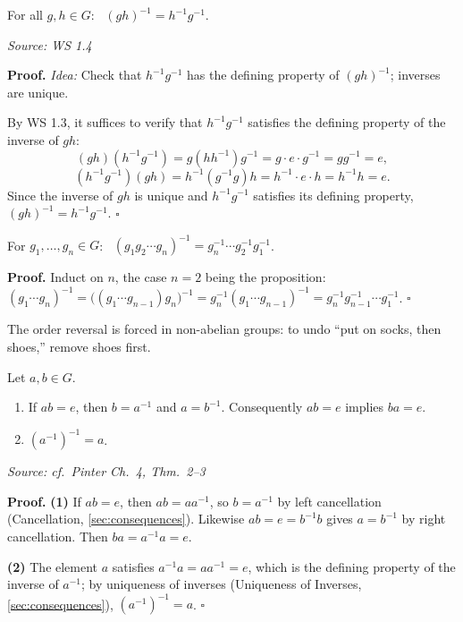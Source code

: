 \documentclass[11pt]{report}
\renewenvironment{proof}[1][Proof]{\noindent\textbf{#1.} }{\hfill$\square$\par\vspace{5pt}}
\newcommand{\srcline}[1]{\par\hfill{\footnotesize\textit{Source: #1}}}
\begin{document}
\begin{propbox}\label{prop:inverse-product}
For all $g, h \in G$: \ $(gh)^{-1} = h^{-1} g^{-1}$.
\srcline{WS 1.4}
\end{propbox}

\begin{proof}
\textit{Idea:} Check that $h^{-1}g^{-1}$ has the defining property of $(gh)^{-1}$; inverses are unique.\par
By WS 1.3, it suffices to verify that $h^{-1} g^{-1}$ satisfies the defining property of the inverse of $gh$:
\[ (gh)(h^{-1} g^{-1}) = g (h h^{-1}) g^{-1} = g \cdot e \cdot g^{-1} = g g^{-1} = e, \]
\[ (h^{-1} g^{-1})(gh) = h^{-1} (g^{-1} g) h = h^{-1} \cdot e \cdot h = h^{-1} h = e. \]
Since the inverse of $gh$ is unique and $h^{-1}g^{-1}$ satisfies its defining property, $(gh)^{-1} = h^{-1} g^{-1}$.
\end{proof}

\begin{corbox}\label{cor:inverse-product-n-elements}
For $g_1, \ldots, g_n \in G$: \ $(g_1 g_2 \cdots g_n)^{-1} = g_n^{-1} \cdots g_2^{-1} g_1^{-1}$.
\end{corbox}

\begin{proof}
Induct on $n$, the case $n = 2$ being the proposition: $(g_1 \cdots g_n)^{-1} = \big((g_1 \cdots g_{n-1})g_n\big)^{-1} = g_n^{-1}(g_1 \cdots g_{n-1})^{-1} = g_n^{-1}g_{n-1}^{-1} \cdots g_1^{-1}$.
\end{proof}

\begin{rembox}\label{rem:socks-shoes}
The order reversal is forced in non-abelian groups: to undo ``put on socks, then shoes,'' remove shoes first.
\end{rembox}

\begin{propbox}\label{prop:one-sided-inverses-suffice}
Let $a, b \in G$.
\begin{enumerate}
    \item If $ab = e$, then $b = a^{-1}$ and $a = b^{-1}$. Consequently $ab = e$ implies $ba = e$.
    \item $(a^{-1})^{-1} = a$.
\end{enumerate}
\srcline{cf.\ Pinter Ch.\ 4, Thm.\ 2--3}
\end{propbox}

\begin{proof}
\textbf{(1)} If $ab = e$, then $ab = a a^{-1}$, so $b = a^{-1}$ by left cancellation (Cancellation, \ref{sec:consequences}). Likewise $ab = e = b^{-1} b$ gives $a = b^{-1}$ by right cancellation. Then $ba = a^{-1} a = e$.

\textbf{(2)} The element $a$ satisfies $a^{-1} a = a a^{-1} = e$, which is the defining property of the inverse of $a^{-1}$; by uniqueness of inverses (Uniqueness of Inverses, \ref{sec:consequences}), $(a^{-1})^{-1} = a$.
\end{proof}
\end{document}
